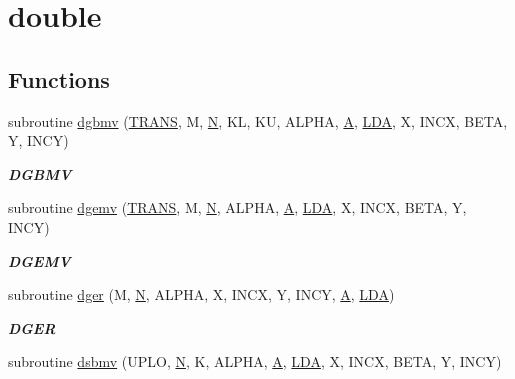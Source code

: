 \hypertarget{group__double__blas__level2}{}\section{double}
\label{group__double__blas__level2}
\subsection*{Functions}
\begin{DoxyCompactItemize}
\item 
subroutine \hyperlink{group__double__blas__level2_ga0dc187c15a47772440defe879d034888}{dgbmv} (\hyperlink{superlu__enum__consts_8h_a0c4e17b2d5cea33f9991ccc6a6678d62a1f61e3015bfe0f0c2c3fda4c5a0cdf58}{T\+R\+A\+N\+S}, M, \hyperlink{polmisc_8c_a0240ac851181b84ac374872dc5434ee4}{N}, K\+L, K\+U, A\+L\+P\+H\+A, \hyperlink{classA}{A}, \hyperlink{example__user_8c_ae946da542ce0db94dced19b2ecefd1aa}{L\+D\+A}, X, I\+N\+C\+X, B\+E\+T\+A, Y, I\+N\+C\+Y)
\begin{DoxyCompactList}\small\item\em {\bfseries D\+G\+B\+M\+V} \end{DoxyCompactList}\item 
subroutine \hyperlink{group__double__blas__level2_gadd421a107a488d524859b4a64c1901a9}{dgemv} (\hyperlink{superlu__enum__consts_8h_a0c4e17b2d5cea33f9991ccc6a6678d62a1f61e3015bfe0f0c2c3fda4c5a0cdf58}{T\+R\+A\+N\+S}, M, \hyperlink{polmisc_8c_a0240ac851181b84ac374872dc5434ee4}{N}, A\+L\+P\+H\+A, \hyperlink{classA}{A}, \hyperlink{example__user_8c_ae946da542ce0db94dced19b2ecefd1aa}{L\+D\+A}, X, I\+N\+C\+X, B\+E\+T\+A, Y, I\+N\+C\+Y)
\begin{DoxyCompactList}\small\item\em {\bfseries D\+G\+E\+M\+V} \end{DoxyCompactList}\item 
subroutine \hyperlink{group__double__blas__level2_ga458222e01b4d348e9b52b9343d52f828}{dger} (M, \hyperlink{polmisc_8c_a0240ac851181b84ac374872dc5434ee4}{N}, A\+L\+P\+H\+A, X, I\+N\+C\+X, Y, I\+N\+C\+Y, \hyperlink{classA}{A}, \hyperlink{example__user_8c_ae946da542ce0db94dced19b2ecefd1aa}{L\+D\+A})
\begin{DoxyCompactList}\small\item\em {\bfseries D\+G\+E\+R} \end{DoxyCompactList}\item 
subroutine \hyperlink{group__double__blas__level2_ga5c7ca036c788c5fd42e04ade0dc92d44}{dsbmv} (U\+P\+L\+O, \hyperlink{polmisc_8c_a0240ac851181b84ac374872dc5434ee4}{N}, K, A\+L\+P\+H\+A, \hyperlink{classA}{A}, \hyperlink{example__user_8c_ae946da542ce0db94dced19b2ecefd1aa}{L\+D\+A}, X, I\+N\+C\+X, B\+E\+T\+A, Y, I\+N\+C\+Y)

\end{DoxyCompactItemize}
